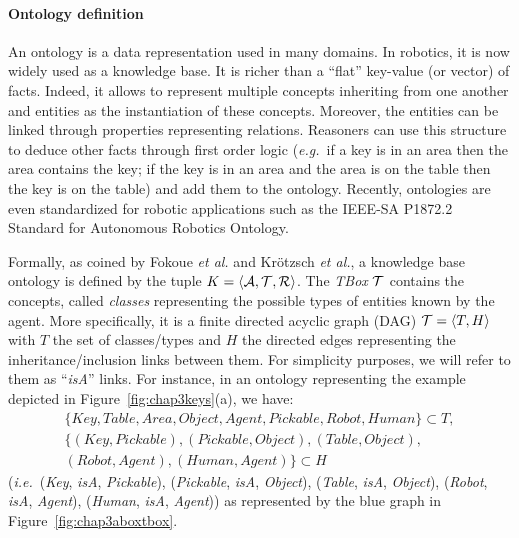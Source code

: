 \documentclass[a4paper,11pt,twoside]{StyleThese}
\begin{document}
\paragraph{Ontology definition}
An ontology is a data representation used in many domains. In robotics, it is now widely used as a knowledge base. It is richer than a ``flat'' key-value (or vector) of facts. Indeed, it allows to represent multiple concepts inheriting from one another and entities as the instantiation of these concepts. Moreover, the entities can be linked through properties representing relations. Reasoners can use this structure to deduce other facts through first order logic (\textit{e.g.}~if a key is in an area then the area contains the key; if the key is in an area and the area is on the table then the key is on the table) and add them to the ontology. Recently, ontologies are even standardized for robotic applications such as the IEEE-SA P1872.2 Standard for Autonomous Robotics Ontology.

Formally, as coined by Fokoue \textit{et al.} \cite{fokoue2006summary} and Kr\"otzsch \textit{et al.}, a knowledge base ontology is defined by the tuple $K = \langle \mathcal{A}, \mathcal{T}, \mathcal{R} \rangle$. 
The \textit{TBox} $\mathcal{T}$ contains the concepts, called \textit{classes} representing the possible types of entities known by the agent. More specifically, it is a finite directed acyclic graph (DAG) $\mathcal{T} = \langle T, H \rangle$ with $T$ the set of classes/types and $H$ the directed edges representing the inheritance/inclusion links between them. For simplicity purposes, we will refer to them as ``\textit{isA}'' links. For instance, in an ontology representing the example depicted in Figure~\ref{fig:chap3keys}(a), we have: 
\begin{multline*}
\{Key, Table, Area, Object, Agent, Pickable, Robot, Human\} \subset T,\\
\{(Key, Pickable), (Pickable, Object), (Table, Object),\\
(Robot, Agent), (Human, Agent)\} \subset H
\end{multline*}
(\textit{i.e.}~(\textit{Key}, \textit{isA}, \textit{Pickable}), (\textit{Pickable}, \textit{isA}, \textit{Object}), (\textit{Table}, \textit{isA}, \textit{Object}), (\textit{Robot}, \textit{isA}, \textit{Agent}), (\textit{Human}, \textit{isA}, \textit{Agent})) as represented by the blue graph in Figure~\ref{fig:chap3aboxtbox}.
\end{document}
